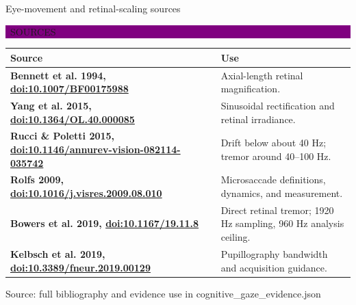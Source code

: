 \documentclass[aspectratio=169,9pt,xcolor=table]{beamer}
\newcommand{\evidence}[2]{%
  \vspace{-0.06cm}\hfill
  \colorbox{#2}{\color{white}\bfseries\scriptsize\strut\ #1\ }\par
  \vspace{0.04cm}
}
\newcommand{\source}[1]{\vfill{\color{Mid}\tiny Source: #1}}
\begin{document}
\begin{frame}{Eye-movement and retinal-scaling sources}
  \evidence{SOURCES}{Purple}
  \scriptsize
  \renewcommand{\arraystretch}{1.28}
  \begin{tabularx}{\textwidth}{>{\bfseries}p{} X}
    \toprule
    Source & Use\\
    \midrule
    Bennett et al. 1994, \href{https://doi.org/10.1007/BF00175988}{doi:10.1007/BF00175988} &
      Axial-length retinal magnification.\\
    Yang et al. 2015, \href{https://doi.org/10.1364/OL.40.000085}{doi:10.1364/OL.40.000085} &
      Sinusoidal rectification and retinal irradiance.\\
    Rucci \& Poletti 2015, \href{https://doi.org/10.1146/annurev-vision-082114-035742}{doi:10.1146/annurev-vision-082114-035742} &
      Drift below about 40 Hz; tremor around 40--100 Hz.\\
    Rolfs 2009, \href{https://doi.org/10.1016/j.visres.2009.08.010}{doi:10.1016/j.visres.2009.08.010} &
      Microsaccade definitions, dynamics, and measurement.\\
    Bowers et al. 2019, \href{https://doi.org/10.1167/19.11.8}{doi:10.1167/19.11.8} &
      Direct retinal tremor; 1920 Hz sampling, 960 Hz analysis ceiling.\\
    Kelbsch et al. 2019, \href{https://doi.org/10.3389/fneur.2019.00129}{doi:10.3389/fneur.2019.00129} &
      Pupillography bandwidth and acquisition guidance.\\
    \bottomrule
  \end{tabularx}
  \source{full bibliography and evidence use in cognitive\_gaze\_evidence.json}
\end{frame}
\end{document}
